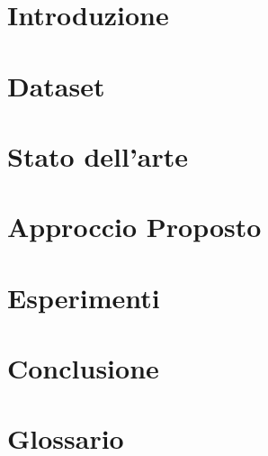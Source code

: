 \documentclass[a4paper,12pt]{report}
\begin{document}
\titlepagecontent

\tableofcontents

\chapter{Introduzione}


\chapter{Dataset}


\chapter{Stato dell'arte}


\chapter{Approccio Proposto}


\chapter{Esperimenti}


\chapter{Conclusione}


\chapter{Glossario}




\end{document}
